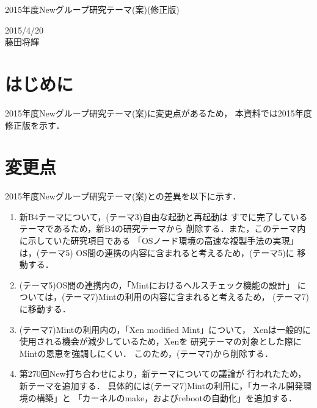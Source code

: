 \documentclass[12pt]{jsarticle}
\begin{document}

\begin{center}
{\LARGE 2015年度Newグループ研究テーマ(案)(修正版)}
\end{center}

\begin{flushright}
  2015/4/20\\
  藤田将輝
\end{flushright}
\section{はじめに}
2015年度Newグループ研究テーマ(案)に変更点があるため，
本資料では2015年度修正版を示す．
\section{変更点}
2015年度Newグループ研究テーマ(案)との差異を以下に示す．
\begin{enumerate}
    \item 新B4テーマについて，(テーマ3)自由な起動と再起動は
        すでに完了しているテーマであるため，新B4の研究テーマから
        削除する．また，このテーマ内に示していた研究項目である
        「OSノード環境の高速な複製手法の実現」は，(テーマ5)
        OS間の連携の内容に含まれると考えるため，(テーマ5)に
        移動する．
    \item (テーマ5)OS間の連携内の，「Mintにおけるヘルスチェック機能の設計」
        については，(テーマ7)Mintの利用の内容に含まれると考えるため，
        (テーマ7)に移動する．
    \item (テーマ7)Mintの利用内の，「Xen modified Mint」について，
        Xenは一般的に使用される機会が減少しているため，Xenを
        研究テーマの対象とした際にMintの恩恵を強調しにくい．
        このため，(テーマ7)から削除する．
    \item 第270回New打ち合わせにより，新テーマについての議論が
        行われたため，新テーマを追加する．
        具体的には(テーマ7)Mintの利用に，「カーネル開発環境の構築」と
        「カーネルのmake，およびrebootの自動化」を追加する．
\end{enumerate}
\end{document}
